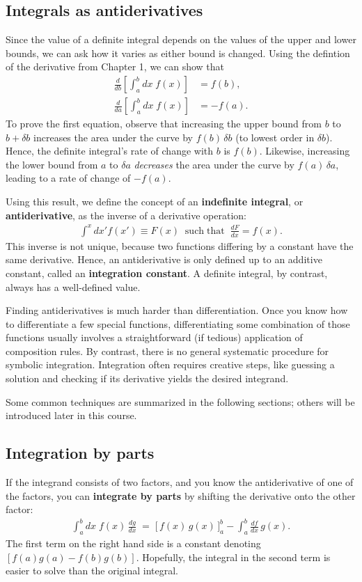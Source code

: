 \documentclass[10pt,a4paper]{article}
\begin{document}
\subsection{Integrals as antiderivatives}
\label{integrals-as-antiderivatives}

Since the value of a definite integral depends on the values of the
upper and lower bounds, we can ask how it varies as either bound is
changed. Using the defintion of the derivative from Chapter 1, we can
show that
\begin{align}
  \frac{d}{db} \left[\int_a^b dx\; f(x)\right] &= f(b), \\
  \frac{d}{da} \left[\int_a^b dx\; f(x)\right] &= -f(a).
\end{align}
To prove the first equation, observe that increasing the upper bound
from $b$ to $b + \delta b$ increases the area under the curve by $f(b)
\, \delta b$ (to lowest order in $\delta b$).  Hence, the definite
integral's rate of change with $b$ is $f(b)$.  Likewise, increasing
the lower bound from $a$ to $\delta a$ \textit{decreases} the area
under the curve by $f(a) \, \delta a$, leading to a rate of change of
$-f(a)$.

Using this result, we define the concept of an \textbf{indefinite
  integral}, or \textbf{antiderivative}, as the inverse of a
derivative operation:
\begin{align}
  \int^x dx' f(x') \equiv F(x) \;\;\mathrm{such}\;\mathrm{that}\;\; \frac{dF}{dx} = f(x).
\end{align}
This inverse is not unique, because two functions differing by a
constant have the same derivative. Hence, an antiderivative is only
defined up to an additive constant, called an \textbf{integration
  constant}. A definite integral, by contrast, always has a
well-defined value.

Finding antiderivatives is much harder than differentiation.  Once you
know how to differentiate a few special functions, differentiating
some combination of those functions usually involves a straightforward
(if tedious) application of composition rules.  By contrast, there is
no general systematic procedure for symbolic integration.  Integration
often requires creative steps, like guessing a solution and checking
if its derivative yields the desired integrand.

Some common techniques are summarized in the following sections;
others will be introduced later in this course.

\subsection{Integration by parts}
If the integrand consists of two factors, and you know the
antiderivative of one of the factors, you can \textbf{integrate by
  parts} by shifting the derivative onto the other factor:
\begin{align}
  \int_a^b dx \; f(x) \, \frac{dg}{dx} \;=\; \Big[\,f(x)\, g(x)\,\Big]_a^b - \int_a^b \frac{df}{dx}\, g(x).
\end{align}
The first term on the right hand side is a constant denoting
$[f(a)g(a) - f(b)g(b)]$.  Hopefully, the integral in the second term
is easier to solve than the original integral.
\end{document}
